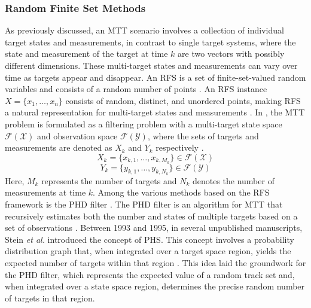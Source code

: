\subsubsection{Random Finite Set Methods}
As previously discussed, an \ac{MTT} scenario involves a collection of individual target states and measurements, in contrast to single target systems, where the state and measurement of the target at time \( k \) are two vectors with possibly different dimensions. These multi-target states and measurements can vary over time as targets appear and disappear. An \ac{RFS} is a set of finite-set-valued random variables and consists of a random number of points \cite{Jerrelind2020}. An \ac{RFS} instance \( X = \{x_1, \ldots, x_n\} \) consists of random, distinct, and unordered points, making \ac{RFS} a natural representation for multi-target states and measurements \cite{Vo2005}. In \cite{Jerrelind2020}, the \ac{MTT} problem is formulated as a filtering problem with a multi-target state space \( \mathcal{F}(\mathcal{X}) \) and observation space \( \mathcal{F}(\mathcal{Y}) \), where the sets of targets and measurements are denoted as \( X_k \) and \( Y_k \) respectively \cite{Jerrelind2020}.
\newline
\begin{equation}
    X_k = \{ x_{k,1}, \ldots, x_{k,M_k} \} \in \mathcal{F}(\mathcal{X}) 
\end{equation}
\begin{equation}
    Y_k = \{ y_{k,1}, \ldots, y_{k,N_k} \} \in \mathcal{F}(\mathcal{Y}) 
\end{equation}
\newline
Here, \( M_k \) represents the number of targets and \( N_k \) denotes the number of measurements at time \( k \). Among the various methods based on the \ac{RFS} framework is the \ac{PHD} filter \cite{Clark2005,PHAMNAMTRUNG2007,Vo2005}. The \ac{PHD} filter is an algorithm for \ac{MTT} that recursively estimates both the number and states of multiple targets based on a set of observations \cite{Prihoda2019}. Between 1993 and 1995, in several unpublished manuscripts, Stein \textit{et al.} introduced the concept of \ac{PHS}. This concept involves a probability distribution graph that, when integrated over a target space region, yields the expected number of targets within that region \cite{Mahler2000}. This idea laid the groundwork for the \ac{PHD} filter, which represents the expected value of a random track set and, when integrated over a state space region, determines the precise random number of targets in that region.

